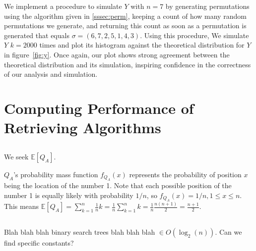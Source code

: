 \documentclass[11pt, oneside]{article}   	%
\begin{document}
We implement a procedure to simulate $Y$ with $n = 7$ by generating permutations using the algorithm given in \ref{sssec:perm}, keeping a count of how many random permutations we generate, and returning this count as soon as a permutation is generated that equals $\sigma = (6, 7, 2, 5, 1, 4, 3)$. Using this procedure, We simulate $Y$ $k = 2000$ times and plot its histogram against the theoretical distribution for $Y$ in figure~\ref{fig:y}. Once again, our plot shows strong agreement between the theoretical distribution and its simulation, inspiring confidence in the correctness of our analysis and simulation.

\section{Computing Performance of Retrieving Algorithms}
\subsection{}
We seek $\mathbb{E}[Q_A]$.

$Q_A$'s probability mass function $f_{Q_A}(x)$ represents the probability of position $x$ being the location of the number 1. Note that each possible position of the number 1 is equally likely with probability $1 / n$, so $f_{Q_A}(x) = 1 / n, 1 \leq x \leq n$. This means $\mathbb{E}[Q_A] = \sum_{k=1}^{n} \frac{1}{n} k = \frac{1}{n} \sum_{k = 1}^{n} k = \frac{1}{n} \frac{n (n + 1)}{2} = \frac{n + 1}{2}$.
\subsection{}
\subsection{}
\subsection{}
Blah blah blah binary search trees blah blah blah $\in O(\log_2(n))$. Can we find specific constants?
\subsection{}
\end{document}
